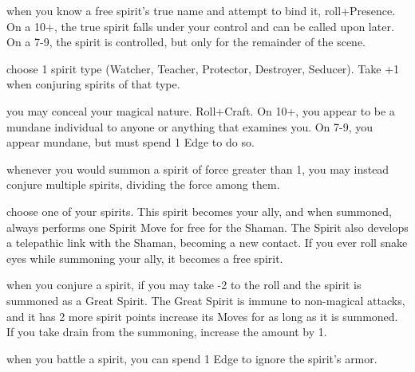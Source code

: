 \begin{dossier}
\begin{dossiermovebar}
 when you know a free spirit’s true name and attempt to bind it, roll+Presence.
On a 10+, the true spirit falls under your control and can be called upon later. On a 7-9, the
spirit is controlled, but only for the remainder of the scene.

 choose 1 spirit type (Watcher, Teacher, Protector, Destroyer, Seducer).
Take +1 when conjuring spirits of that type.

 you may conceal your magical nature. Roll+Craft. On 10+, you appear to
be a mundane individual to anyone or anything that examines you. On 7-9, you appear
mundane, but must spend 1 Edge to do so.

 whenever you
would summon a spirit of force greater than 1, you
may instead conjure multiple spirits, dividing the force among them.

 choose one of your spirits. This spirit becomes your ally, and when summoned,
always performs one Spirit Move for free for the Shaman. The Spirit also develops a
telepathic link with the Shaman, becoming a new contact. If you ever roll snake eyes while
summoning your ally, it becomes a free spirit.

 when you conjure a
spirit, if you may take -2 to the roll and the spirit is summoned as a Great Spirit. The Great Spirit is immune
to non-magical attacks, and it has 2 more spirit points increase its Moves for as long as it is
summoned. If you take drain from the summoning,
increase the amount by 1.

 when you battle a spirit, you can spend 1 Edge to 
                  ignore the spirit’s armor. 

\end{dossiermovebar}%
\end{dossier}

